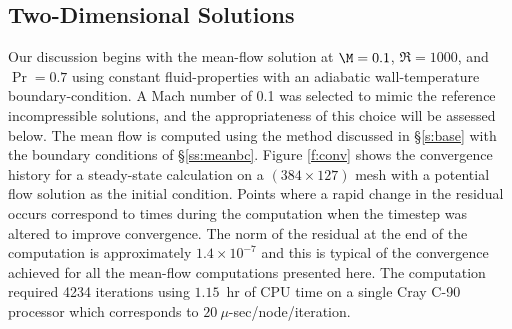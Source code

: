 \subsection{Two-Dimensional Solutions \label{ss:2Dmean} }

Our discussion begins with the mean-flow solution at $\M=0.1$, $\Re=1000$, and
$\Pr=0.7$ using constant fluid-properties with an adiabatic wall-temperature
boundary-condition.  A Mach number of 0.1 was selected to mimic the reference
incompressible solutions, and the appropriateness of this choice will be
assessed below.  The mean flow is computed using the method discussed in
\S\ref{s:base} with the boundary conditions of \S\ref{ss:meanbc}.  Figure
\ref{f:conv} shows the convergence history for a steady-state calculation on a
$(384 \times 127)$ mesh with a potential flow solution as the initial
condition.  Points where a rapid change in the residual occurs correspond to
times during the computation when the timestep was altered to improve
convergence.  The norm of the residual at the end of the computation is
approximately $1.4\times 10^{-7}$ and this is typical of the convergence
achieved for all the mean-flow computations presented here.  The computation
required 4234 iterations using $1.15$~hr of CPU time on a single Cray C-90
processor which corresponds to $20~\mu$-sec/node/iteration.

%
%


